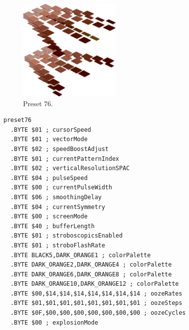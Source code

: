 \begin{minipage}[b]{0.48\linewidth}
\begin{figure}[H]                                                          
  \centering                                                             
  \begin{adjustbox}{width=5cm,center}                                   
  \includegraphics[width=5cm]{src/colorspace_presets/preset76-45.png}%
  \end{adjustbox}                                                        
\caption*{Preset 76.}                                           
\end{figure}                                                               
\end{minipage}
\hspace{0.1cm}
\begin{minipage}[b]{0.48\linewidth}                                       
\begin{lstlisting}[basicstyle=\ttfamily\tiny]
preset76
  .BYTE $01 ; cursorSpeed
  .BYTE $01 ; vectorMode
  .BYTE $02 ; speedBoostAdjust
  .BYTE $01 ; currentPatternIndex
  .BYTE $02 ; verticalResolutionSPAC
  .BYTE $04 ; pulseSpeed
  .BYTE $00 ; currentPulseWidth
  .BYTE $06 ; smoothingDelay
  .BYTE $04 ; currentSymmetry
  .BYTE $00 ; screenMode
  .BYTE $40 ; bufferLength
  .BYTE $01 ; stroboscopicsEnabled
  .BYTE $01 ; stroboFlashRate
  .BYTE BLACK5,DARK_ORANGE1 ; colorPalette
  .BYTE DARK_ORANGE2,DARK_ORANGE4 ; colorPalette
  .BYTE DARK_ORANGE6,DARK_ORANGE8 ; colorPalette
  .BYTE DARK_ORANGE10,DARK_ORANGE12 ; colorPalette
  .BYTE $00,$14,$14,$14,$14,$14,$14,$14 ; oozeRates
  .BYTE $01,$01,$01,$01,$01,$01,$01,$01 ; oozeSteps
  .BYTE $0F,$00,$00,$00,$00,$00,$00,$00 ; oozeCycles
  .BYTE $00 ; explosionMode
\end{lstlisting}
\end{minipage}
\clearpage

